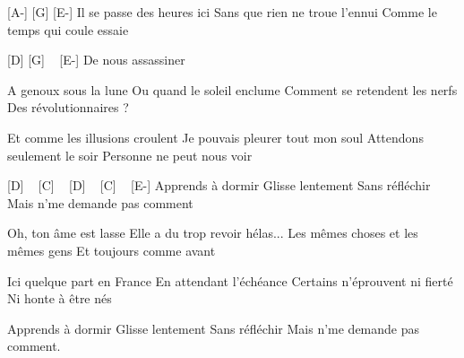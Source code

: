 [A-] [G] [E-]
Il se passe des heures ici
Sans que rien ne troue l'ennui
Comme le temps qui coule essaie

[D] [G] ~ [E-]
De nous assassiner

A genoux sous la lune
Ou quand le soleil enclume
Comment se retendent les nerfs
Des révolutionnaires ?

Et comme les illusions croulent
Je pouvais pleurer tout mon soul
Attendons seulement le soir
Personne ne peut nous voir

[D] ~ [C] ~ [D] ~ [C] ~ [E-]
Apprends à dormir
Glisse lentement
Sans réfléchir
Mais n'me demande pas comment

Oh, ton âme est lasse
Elle a du trop revoir hélas...
Les mêmes choses et les mêmes gens
Et toujours comme avant

Ici quelque part en France
En attendant l'échéance
Certains n'éprouvent ni fierté
Ni honte à être nés

Apprends à dormir
Glisse lentement
Sans réfléchir
Mais n'me demande pas comment.

